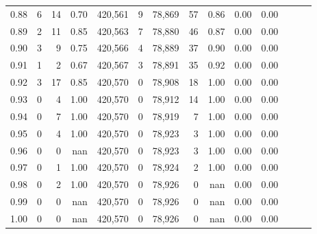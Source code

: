 \begin{tabular}{rrrrrrrrrrrrrr}
0.88 &       6 &     14 &  0.70 &  420,561 &        9 &  78,869 &      57 &  0.86 &  0.00 &      0.00 \\
0.89 &       2 &     11 &  0.85 &  420,563 &        7 &  78,880 &      46 &  0.87 &  0.00 &      0.00 \\
0.90 &       3 &      9 &  0.75 &  420,566 &        4 &  78,889 &      37 &  0.90 &  0.00 &      0.00 \\
0.91 &       1 &      2 &  0.67 &  420,567 &        3 &  78,891 &      35 &  0.92 &  0.00 &      0.00 \\
0.92 &       3 &     17 &  0.85 &  420,570 &        0 &  78,908 &      18 &  1.00 &  0.00 &      0.00 \\
0.93 &       0 &      4 &  1.00 &  420,570 &        0 &  78,912 &      14 &  1.00 &  0.00 &      0.00 \\
0.94 &       0 &      7 &  1.00 &  420,570 &        0 &  78,919 &       7 &  1.00 &  0.00 &      0.00 \\
0.95 &       0 &      4 &  1.00 &  420,570 &        0 &  78,923 &       3 &  1.00 &  0.00 &      0.00 \\
0.96 &       0 &      0 &   nan &  420,570 &        0 &  78,923 &       3 &  1.00 &  0.00 &      0.00 \\
0.97 &       0 &      1 &  1.00 &  420,570 &        0 &  78,924 &       2 &  1.00 &  0.00 &      0.00 \\
0.98 &       0 &      2 &  1.00 &  420,570 &        0 &  78,926 &       0 &   nan &  0.00 &      0.00 \\
0.99 &       0 &      0 &   nan &  420,570 &        0 &  78,926 &       0 &   nan &  0.00 &      0.00 \\
1.00 &       0 &      0 &   nan &  420,570 &        0 &  78,926 &       0 &   nan &  0.00 &      0.00 \\
\bottomrule
\end{tabular}
